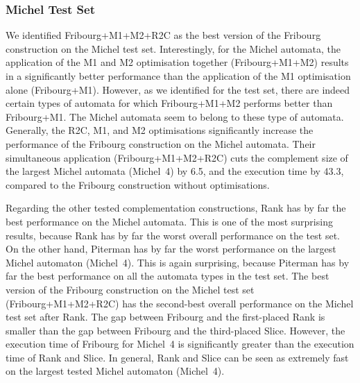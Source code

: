 \subsubsection{Michel Test Set}
We identified Fribourg+M1+M2+R2C as the best version of the Fribourg construction on the Michel test set. Interestingly, for the Michel automata, the application of the M1 and M2 optimisation together (Fribourg+M1+M2) results in a significantly better performance than the application of the M1 optimisation alone (Fribourg+M1). However, as we identified for the \goal{} test set, there are indeed certain types of automata for which Fribourg+M1+M2 performs better than Fribourg+M1. The Michel automata seem to belong to these type of automata. Generally, the R2C, M1, and M2 optimisations significantly increase the performance of the Fribourg construction on the Michel automata. Their simultaneous application (Fribourg+M1+M2+R2C) cuts the complement size of the largest Michel automata (Michel~4) by 6.5, and the execution time by 43.3, compared to the Fribourg construction without optimisations.

Regarding the other tested complementation constructions, Rank has by far the best performance on the Michel automata. This is one of the most surprising results, because Rank has by far the worst overall performance on the \goal{} test set. On the other hand, Piterman has by far the worst performance on the largest Michel automaton (Michel~4). This is again surprising, because Piterman has by far the best performance on all the automata types in the \goal{} test set. The best version of the Fribourg construction on the Michel test set (Fribourg+M1+M2+R2C) has the second-best overall performance on the Michel test set after Rank. The gap between Fribourg and the first-placed Rank is smaller than the gap between Fribourg and the third-placed Slice. However, the execution time of Fribourg for Michel~4 is significantly greater than the execution time of Rank and Slice. In general, Rank and Slice can be seen as extremely fast on the largest tested Michel automaton (Michel~4).




